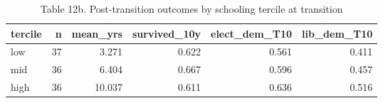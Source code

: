 \begin{table}
\caption{Table 12b. Post-transition outcomes by schooling tercile at transition}
\label{tab:T12b_by_tercile}
\begin{tabular}{lrrrrr}
\toprule
tercile & n & mean\_yrs & survived\_10y & elect\_dem\_T10 & lib\_dem\_T10 \\
\midrule
low & 37 & 3.271 & 0.622 & 0.561 & 0.411 \\
mid & 36 & 6.404 & 0.667 & 0.596 & 0.457 \\
high & 36 & 10.037 & 0.611 & 0.636 & 0.516 \\
\bottomrule
\end{tabular}
\end{table}
